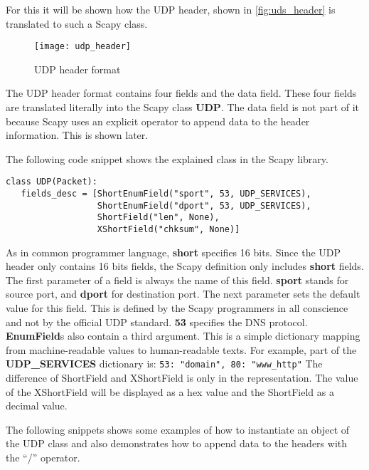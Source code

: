 For this it will be shown how the UDP header, shown in \autoref{fig:uds_header} is translated to such a Scapy class.

\begin{figure}[h]
    \centering
    \texttt{[image: udp\_header]}
    \caption{UDP header format \cite{udp_header}}
    \label{fig:uds_header}
\end{figure}

The UDP header format contains four fields and the data field. These four fields are translated literally into the Scapy class \textbf{UDP}. The data field is not part of it because Scapy uses an explicit operator to append data to the header information. This is shown later.

The following code snippet shows the explained class in the Scapy library.

\begin{samepage}
\begin{verbatim}
class UDP(Packet):
   fields_desc = [ShortEnumField("sport", 53, UDP_SERVICES),
                  ShortEnumField("dport", 53, UDP_SERVICES),
                  ShortField("len", None),
                  XShortField("chksum", None)]
\end{verbatim}
\end{samepage}

As in common programmer language, \textbf{short} specifies 16 bits. Since the UDP header only contains 16 bits fields, the Scapy definition only includes \textbf{short} fields. The first parameter of a field is always the name of this field. \textbf{sport} stands for source port, and \textbf{dport} for destination port.
The next parameter sets the default value for this field. This is defined by the Scapy programmers in all conscience and not by the official UDP standard. \textbf{53} specifies the DNS protocol.
\textbf{EnumField}s also contain a third argument. This is a simple dictionary mapping from machine-readable values to human-readable texts. For example, part of the \textbf{UDP\_SERVICES} dictionary is: \texttt{{53: "domain", 80: "www_http"}}
The difference of ShortField and XShortField is only in the representation. The value of the XShortField will be displayed as a hex value and the ShortField as a decimal value.

The following snippets shows some examples of how to instantiate an object of the UDP class and also demonstrates how to append data to the headers with the “/” operator.

